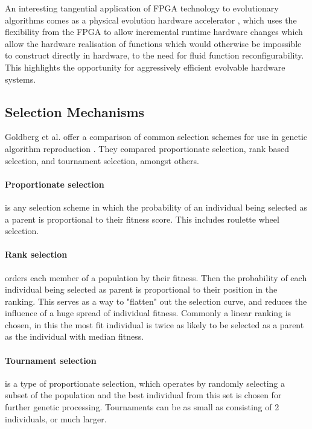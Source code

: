 An interesting tangential application of FPGA technology to evolutionary algorithms comes as
a physical evolution hardware accelerator \cite{1377261}, which uses the flexibility from the
FPGA to allow incremental runtime hardware changes which allow the hardware realisation of
functions which would otherwise be impossible to construct directly in hardware, to the
need for fluid function reconfigurability.
This highlights the opportunity for aggressively efficient evolvable hardware
systems.

\subsection{Selection Mechanisms}

Goldberg et al. offer a comparison of common selection schemes for use in genetic
algorithm reproduction \cite{GOLDBERG199169}. They compared proportionate
selection, rank based selection, and tournament selection, amongst others.

\paragraph{Proportionate selection} is any selection scheme in which the probability
of an individual being selected as a parent is proportional to their fitness score.
This includes roulette wheel selection.

\paragraph{Rank selection} orders each member of a population by their
fitness. Then the probability of each individual being selected as
parent is proportional to their position in the ranking. This serves as
a way to "flatten" out the selection curve, and reduces the influence of
a huge spread of individual fitness. Commonly a linear ranking is chosen,
in this the most fit individual is twice as likely to be selected
as a parent as the individual with median fitness.

\paragraph{Tournament selection} is a type of proportionate selection,
which operates by randomly selecting a subset of the
population and the best individual from this set is chosen for further genetic
processing. Tournaments can be as small as consisting of 2 individuals, or much
larger.

